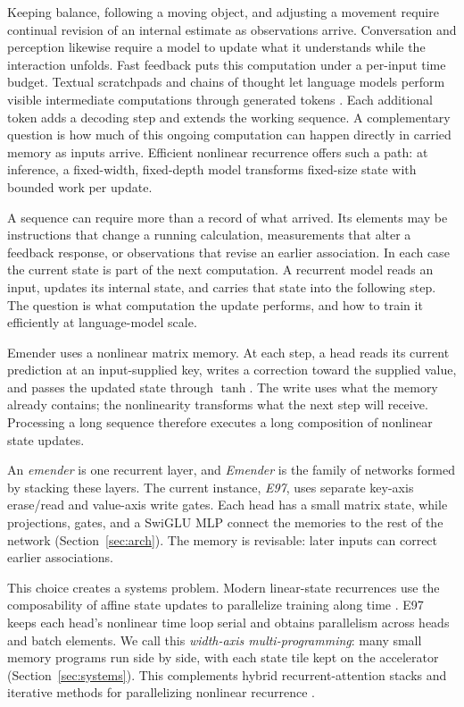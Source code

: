 \documentclass[10pt]{article}
\theoremstyle{canonical}
\theoremstyle{canonicalbullet}
\begin{document}
Keeping balance, following a moving object, and adjusting a movement require continual revision of an internal estimate as observations arrive. Conversation and perception likewise require a model to update what it understands while the interaction unfolds. Fast feedback puts this computation under a per-input time budget. Textual scratchpads and chains of thought let language models perform visible intermediate computations through generated tokens \citep{nye2021scratchpads} \citep{wei2022chain}. Each additional token adds a decoding step and extends the working sequence. A complementary question is how much of this ongoing computation can happen directly in carried memory as inputs arrive. Efficient nonlinear recurrence offers such a path: at inference, a fixed-width, fixed-depth model transforms fixed-size state with bounded work per update.

A sequence can require more than a record of what arrived. Its elements may be instructions that change a running calculation, measurements that alter a feedback response, or observations that revise an earlier association. In each case the current state is part of the next computation. A recurrent model reads an input, updates its internal state, and carries that state into the following step. The question is what computation the update performs, and how to train it efficiently at language-model scale.

Emender uses a nonlinear matrix memory. At each step, a head reads its current prediction at an input-supplied key, writes a correction toward the supplied value, and passes the updated state through $\operatorname{tanh}$. The write uses what the memory already contains; the nonlinearity transforms what the next step will receive. Processing a long sequence therefore executes a long composition of nonlinear state updates.

An \emph{emender} is one recurrent layer, and \emph{Emender} is the family of networks formed by stacking these layers. The current instance, \emph{E97}, uses separate key-axis erase/read and value-axis write gates. Each head has a small matrix state, while projections, gates, and a SwiGLU MLP connect the memories to the rest of the network (Section~\ref{sec:arch}). The memory is revisable: later inputs can correct earlier associations.

This choice creates a systems problem. Modern linear-state recurrences use the composability of affine state updates to parallelize training along time \citep{mamba2024} \citep{mamba2_2024} \citep{gated_deltanet2024} \citep{gated_deltanet2_2026}. E97 keeps each head's nonlinear time loop serial and obtains parallelism across heads and batch elements. We call this \emph{width-axis multi-programming}: many small memory programs run side by side, with each state tile kept on the accelerator (Section~\ref{sec:systems}). This complements hybrid recurrent-attention stacks and iterative methods for parallelizing nonlinear recurrence \citep{m2rnn2026} \citep{pararnn2025}.
\end{document}

